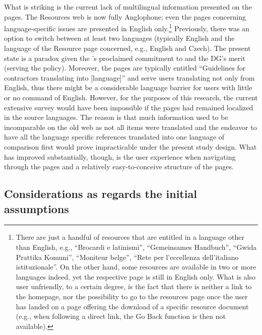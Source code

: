 \documentclass[output=paper]{langsci/langscibook}
\begin{document}
What is striking is the current lack of multilingual information presented on the pages. The Resources web is now fully Anglophone; even the pages concerning language-specific issues are presented in English only.\footnote{There are just a handful of resources that are entitled in a language other than English, e.g., “Brocardi e latinismi”, “Gemeinsames Handbuch”, “Gwida Prattika Komuni”, “Moniteur belge”, “Rete per l’eccellenza dell’italiano istituzionale”. On the other hand, some resources are available in two or more languages indeed, yet the respective page is still in English only. What is also user unfriendly, to a certain degree, is the fact that there is neither a link to the  homepage, nor the possibility to go to the resources page once the user has landed on a page offering the download of a specific resource document (e.g., when following a direct link, the Go Back function is then not available).} Previously, there was an option to switch between at least two languages (typically English and the language of the Resource page concerned, e.g., English and Czech). The present state is a paradox given the ’s proclaimed commitment to  and the DG’s merit (serving the  policy). Moreover, the pages are typically entitled “Guidelines for contractors translating into [language]” and serve users translating not only from English, thus there might be a considerable language barrier for users with little or no command of English. However, for the purposes of this research, the current extensive survey would have been impossible if the pages had remained localized in the source languages. The reason is that much information used to be incomparable on the old web as not all items were translated and the endeavor to have all the language specific references translated into one language of comparison first would prove impracticable under the present study design. What has improved substantially, though, is the user experience when navigating through the pages and a relatively easy-to-conceive structure of the pages. 

\subsection{Considerations as regards the initial assumptions}\label{sec:svoboda:5.4}
\end{document}
